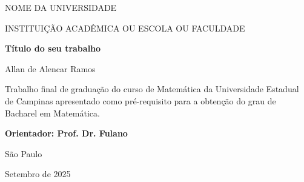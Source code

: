 \documentclass[12pt, a4paper]{article}
\begin{document}
\begin{titlepage}

\addtolength{\topmargin}{1.5cm}

\setlength{\baselineskip}{1.4\baselineskip}

\begin{center}
\large{NOME DA UNIVERSIDADE}

\large{INSTITUIÇÃO ACADÊMICA OU ESCOLA OU FACULDADE }
\end{center}

\vspace{2cm}

\begin{center}
\Large{\textbf{Título do seu trabalho}}
\end{center}

\vspace{1.5cm}

\begin{center}
\Large{Allan de Alencar Ramos}
\end{center}

\vspace{2cm}

\begin{flushright}
\begin{minipage}{10cm}
\hrulefill

Trabalho final de graduação do curso de Matemática da Universidade Estadual de Campinas apresentado como pré-requisito para a obtenção do grau de Bacharel em Matemática.

\hrulefill

\textbf{Orientador: Prof. Dr. Fulano}

\end{minipage}
\end{flushright}

\setlength{\baselineskip}{0.7\baselineskip}

\vfill

\begin{center}
São Paulo

Setembro de 2025
\end{center}

\end{titlepage}
\end{document}

